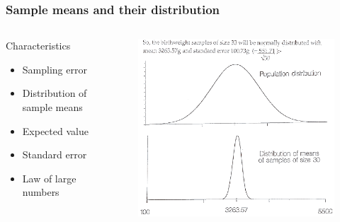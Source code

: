 \documentclass[10pt, compress]{beamer}
\begin{document}
\begin{frame}
    \frametitle{Sample means and their distribution}
    \begin{columns}
        \begin{block}{Characteristics}
            \begin{itemize}

                \item Sampling error
                \item Distribution of sample means
                \item Expected value
                \item Standard error
                \item Law of large numbers
            \end{itemize}
        \end{block}
        \begin{block}{}
            \begin{figure}
                \begin{center}
                    \includegraphics[scale=0.3]{img/14_diag_b.png}
                \end{center}
            \end{figure}
        \end{block}
    \end{columns}
\end{frame}
\end{document}
